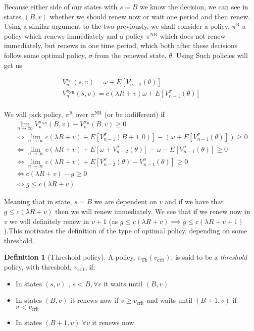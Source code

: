 \documentclass[a4paper,10pt]{article}
\theoremstyle{definition}
\newtheorem{definition}[theorem]{Definition}
\theoremstyle{definition}
\theoremstyle{remark}
\theoremstyle{definition}
\begin{document}
Because either side of our states with $s=B$ we know the decision, we can see in states $(B,v)$ whether we should renew now or wait one period and then renew. Using a similar argument to the two previously, we shall consider a policy, $\pi^{\text{R}}$ a policy which renews immediately and a policy $\pi^{\text{NR}}$ which does not renew immediately, but renews in one time period, which both after these decisions follow some optimal policy, $\sigma$ from the renewed state, $\theta$. Using Such policies will get us

\begin{align*}
&V_{n}^{\pi_{\text{R}}}(s,v)= \omega + E[V_{n-1}^{\sigma}(\theta)] \\
&V_{n}^{\pi_{\text{NR}}}(s,v)= c (\lambda R +v) \omega + E[V_{n-1}^{\sigma}(\theta)] \\
\end{align*}

We will pick policy, $\pi^{\text{R}}$ over $\pi^{\text{NR}}$ (or be indifferent) if
\begin{align*}
&\lim\limits_{n \rightarrow \infty} V_{n}^{\pi_{NR}} (B,v) - V_{n}^{\pi_{R}}(B,v) \geq 0 \\
& \iff \lim\limits_{n \rightarrow \infty} c (\lambda R + v) + E[V_{n-1}^{\sigma}(B+1,0)] - (\omega + E[V_{n-1}^{\sigma}(\theta)]) \geq 0 \\
& \iff \lim\limits_{n \rightarrow \infty} c (\lambda R + v)  + E[ \omega + V_{n-2}^{\sigma}(\theta)] - \omega - E[V_{n-1}^{\sigma}(\theta)] \geq 0 \\
& \iff \lim\limits_{n \rightarrow \infty} c(\lambda R + v) + E[V_{n-2}^{\sigma}(\theta) - V_{n-1}^{\sigma}(\theta)] \geq 0 \\
& \iff c (\lambda R+v) - g \geq 0 \\
& \iff g \leq c (\lambda R +v) 
\end{align*}

Meaning that in state, $s=B$ we are dependent on $v$ and if we have that $g \leq c (\lambda R +v)$ then we will renew immediately. We see that if we renew now in $v$ we will definitely renew in $v+1$ (as $g \leq c (\lambda R +v) \implies g \leq c (\lambda R +v+1)$).This motivates the definition of the type of optimal policy, depending on some threshold.

\begin{definition}[Threshold policy]
A policy, $\pi_{\text{Th}}(v_{\text{crit}})$, is said to be a \textit{threshold} policy, with threshold, $v_{\text{crit}}$, if:
\begin{itemize}
\item In states $(s,v)$ , $s < B, \forall v$ it waits until $(B,v)$
\item In states $(B,v)$ it renews now if $v \geq v_{\text{crit}}$ and waits until $(B+1,v)$ if $v < v_{\text{crit}}$
\item In states $(B+1,v) \; \forall v$ it renews now.
\end{itemize}
\end{definition}
\end{document}
